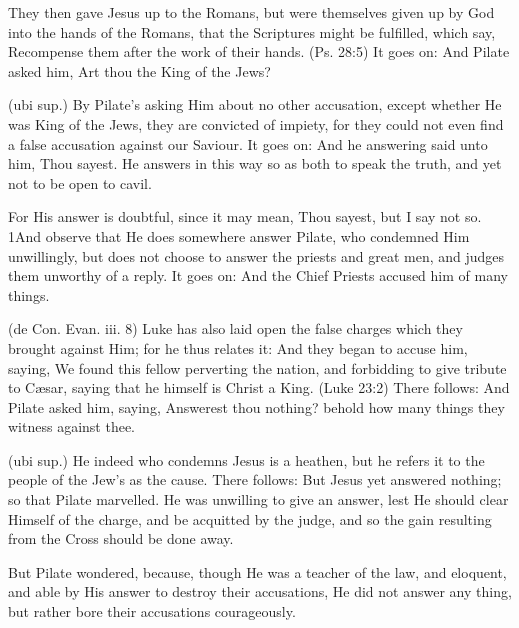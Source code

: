  They then gave Jesus up to the Romans, but were themselves given up by God into the hands of the Romans, that the Scriptures might be fulfilled, which say, Recompense them after the work of their hands. (Ps. 28:5) It goes on: And Pilate asked him, Art thou the King of the Jews?

 (ubi sup.) By Pilate’s asking Him about no other accusation, except whether He was King of the Jews, they are convicted of impiety, for they could not even find a false accusation against our Saviour. It goes on: And he answering said unto him, Thou sayest. He answers in this way so as both to speak the truth, and yet not to be open to cavil.

 For His answer is doubtful, since it may mean, Thou sayest, but I say not so. 1And observe that He does somewhere answer Pilate, who condemned Him unwillingly, but does not choose to answer the priests and great men, and judges them unworthy of a reply. It goes on: And the Chief Priests accused him of many things.

 (de Con. Evan. iii. 8) Luke has also laid open the false charges which they brought against Him; for he thus relates it: And they began to accuse him, saying, We found this fellow perverting the nation, and forbidding to give tribute to Cæsar, saying that he himself is Christ a King. (Luke 23:2) There follows: And Pilate asked him, saying, Answerest thou nothing? behold how many things they witness against thee.

 (ubi sup.) He indeed who condemns Jesus is a heathen, but he refers it to the people of the Jew’s as the cause. There follows: But Jesus yet answered nothing; so that Pilate marvelled. He was unwilling to give an answer, lest He should clear Himself of the charge, and be acquitted by the judge, and so the gain resulting from the Cross should be done away.

 But Pilate wondered, because, though He was a teacher of the law, and eloquent, and able by His answer to destroy their accusations, He did not answer any thing, but rather bore their accusations courageously.

 

